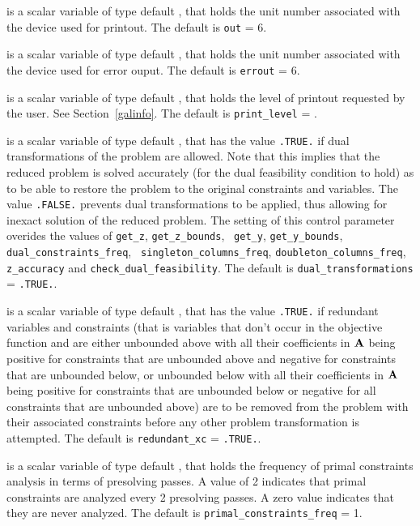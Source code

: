 \documentclass{galahad}
\newcommand{\sym}{\tt\small}
\begin{document}
\begin{description}
 is a scalar variable of type default \integer, that holds the
unit number associated with the device used for printout.
The default is {\tt out} = 6.

 is a scalar variable of type default \integer, that holds the
unit number associated with the device used for error ouput.
The default is {\tt errout} = 6.

 is a scalar variable of type default \integer, that holds the
level of printout requested by the user. See Section~\ref{galinfo}.
The default is {\tt print\_level} = {\sym \galsymsilent}.

 is a scalar variable of type default \logical,
that has the value {\tt .TRUE.} if dual transformations of the problem are
allowed. Note that this implies that the reduced problem is solved
accurately (for the dual feasibility condition to hold)
as to be able to restore the problem to the original
constraints and variables. The value {\tt .FALSE.} prevents dual
transformations to be applied, thus allowing for inexact
solution of the reduced problem. The setting of this control
parameter overides the values of {\tt get\_z}, {\tt get\_z\_bounds}, {\tt
get\_y}, {\tt get\_y\_bounds}, {\tt dual\_constraints\_freq}, {\tt
singleton\_columns\_freq}, {\tt doubleton\_columns\_freq}, {\tt z\_accuracy}
and {\tt  check\_dual\_feasibility}.
The default is {\tt dual\_transformations} = {\tt .TRUE.}.

 is a scalar variable of type default \logical,
that has the value {\tt .TRUE.} if redundant variables and constraints
(that is variables that don't occur in the objective function and are
either unbounded above with all their coefficients in ${\mathbf{A}}$
being positive for constraints that are unbounded above and negative for
constraints that are unbounded below, or unbounded below
with all their coefficients in ${\mathbf{A}}$ being positive for constraints that are
unbounded below or negative for all constraints that are unbounded above)
are to be removed from the problem with their associated constraints before
any other problem transformation is attempted.
The default is {\tt redundant\_xc} = {\tt .TRUE.}.

 is a scalar variable of type default \integer,
that holds the  frequency of primal constraints analysis in terms of
presolving passes.  A value of 2 indicates that primal
constraints are analyzed every 2 presolving passes. A zero
value indicates that they are never analyzed.
The default is {\tt primal\_constraints\_freq} = 1.


\end{description}
\end{document}
